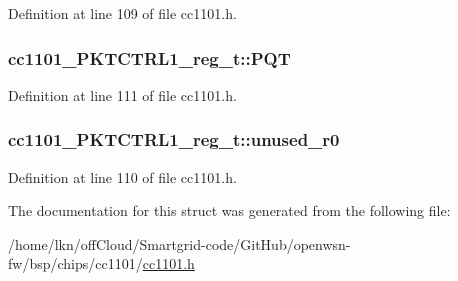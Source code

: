 Definition at line 109 of file cc1101.\+h.

\subsubsection[{\texorpdfstring{P\+QT}{PQT}}]{ cc1101\+\_\+\+P\+K\+T\+C\+T\+R\+L1\+\_\+reg\+\_\+t\+::\+P\+QT}\hypertarget{structcc1101___p_k_t_c_t_r_l1__reg__t_a8c83755e7456f1894f749982fabd87ad}{}\label{structcc1101___p_k_t_c_t_r_l1__reg__t_a8c83755e7456f1894f749982fabd87ad}


Definition at line 111 of file cc1101.\+h.

\subsubsection[{\texorpdfstring{unused\+\_\+r0}{unused_r0}}]{ cc1101\+\_\+\+P\+K\+T\+C\+T\+R\+L1\+\_\+reg\+\_\+t\+::unused\+\_\+r0}\hypertarget{structcc1101___p_k_t_c_t_r_l1__reg__t_a730c3743ec1c3813c8eef71ec40ee080}{}\label{structcc1101___p_k_t_c_t_r_l1__reg__t_a730c3743ec1c3813c8eef71ec40ee080}


Definition at line 110 of file cc1101.\+h.



The documentation for this struct was generated from the following file\+:\begin{DoxyCompactItemize}
\item 
/home/lkn/off\+Cloud/\+Smartgrid-\/code/\+Git\+Hub/openwsn-\/fw/bsp/chips/cc1101/\hyperlink{cc1101_8h}{cc1101.\+h}\end{DoxyCompactItemize}
